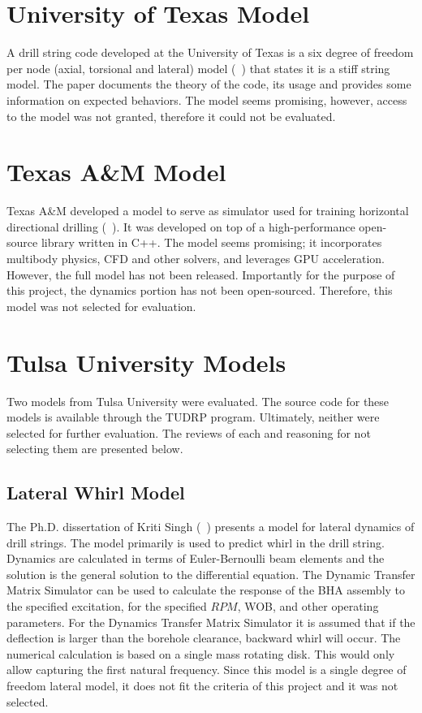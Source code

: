 \section{University of Texas Model}
A drill string code developed at the University of Texas is a six degree of freedom per node (axial, torsional and lateral) model (~\cite{ref:zhang2023a}) that states it is a stiff string model.  The paper documents the theory of the code, its usage and provides some information on expected behaviors.  The model seems promising, however, access to the model was not granted, therefore it could not be evaluated.

\section{Texas A\&M Model}
Texas A\&M developed a model to serve as simulator used for training horizontal directional drilling (~\cite{ref:losoya2020a}).  It was developed on top of a high-performance open-source library written in C++.  The model seems promising; it incorporates multibody physics, CFD and other solvers, and leverages GPU acceleration.  However, the full model has not been released.  Importantly for the purpose of this project, the dynamics portion has not been open-sourced.  Therefore, this model was not selected for evaluation.

\section{Tulsa University Models}
Two models from Tulsa University were evaluated.  The source code for these models is available through the TUDRP program. Ultimately, neither were selected for further evaluation.  The reviews of each and reasoning for not selecting them are presented below.

\subsection{Lateral Whirl Model}
The Ph.D. dissertation of Kriti Singh (~\cite{ref:singh2019a}) presents a model for lateral dynamics of drill  strings.  The model primarily is used to predict whirl in the drill string.  Dynamics are calculated in terms of Euler-Bernoulli beam elements and the solution is the general solution to the differential equation.  The Dynamic Transfer Matrix Simulator can be used to calculate the response of the BHA assembly to the specified excitation, for the specified $RPM$, WOB, and other operating parameters.  For the Dynamics Transfer Matrix Simulator it is assumed that if the deflection is larger than the borehole clearance, backward whirl will occur.  The numerical calculation is based on a single mass rotating disk.  This would only allow capturing the first natural frequency.  Since this model is a single degree of freedom lateral model, it does not fit the criteria of this project and it was not selected.

